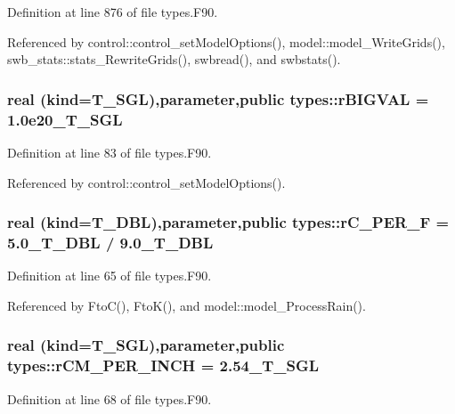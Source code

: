 Definition at line 876 of file types.F90.



Referenced by control::control\_\-setModelOptions(), model::model\_\-WriteGrids(), swb\_\-stats::stats\_\-RewriteGrids(), swbread(), and swbstats().

\hypertarget{namespacetypes_aa47fdce92f090579ada31ab06c3545ed}{
\subsubsection[{rBIGVAL}]{\setlength{\rightskip}{0pt plus 5cm}real (kind={\bf T\_\-SGL}),parameter,public {\bf types::rBIGVAL} = 1.0e20\_\-T\_\-SGL}}
\label{namespacetypes_aa47fdce92f090579ada31ab06c3545ed}


Definition at line 83 of file types.F90.



Referenced by control::control\_\-setModelOptions().

\hypertarget{namespacetypes_a5ff46874e183669d28f6a46080ea20b7}{
\subsubsection[{rC\_\-PER\_\-F}]{\setlength{\rightskip}{0pt plus 5cm}real (kind={\bf T\_\-DBL}),parameter,public {\bf types::rC\_\-PER\_\-F} = 5.0\_\-T\_\-DBL / 9.0\_\-T\_\-DBL}}
\label{namespacetypes_a5ff46874e183669d28f6a46080ea20b7}


Definition at line 65 of file types.F90.



Referenced by FtoC(), FtoK(), and model::model\_\-ProcessRain().

\hypertarget{namespacetypes_ab949fb6f49c2e3dfb6fa084310d81edf}{
\subsubsection[{rCM\_\-PER\_\-INCH}]{\setlength{\rightskip}{0pt plus 5cm}real (kind={\bf T\_\-SGL}),parameter,public {\bf types::rCM\_\-PER\_\-INCH} = 2.54\_\-T\_\-SGL}}
\label{namespacetypes_ab949fb6f49c2e3dfb6fa084310d81edf}


Definition at line 68 of file types.F90.




